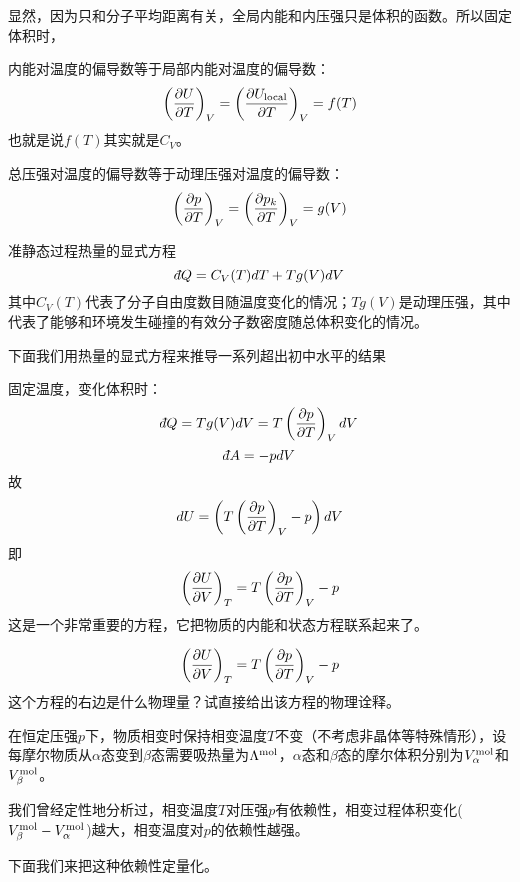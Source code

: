 \documentclass[CJK]{beamer}
\begin{document}
\begin{frame}
\bch
显然，因为只和分子平均距离有关，{\blue 全局内能和内压强只是体积的函数}。所以固定体积时，

\bitem
\item{内能对温度的偏导数等于局部内能对温度的偏导数：
$$ \left(\frac{\partial U}{\partial T}\right)_{V} = \left(\frac{\partial U_{\rm local}}{\partial T}\right)_{V} = f(T) $$
也就是说$f(T)$其实就是$C_V$。}
\item{
总压强对温度的偏导数等于动理压强对温度的偏导数：
$$\left(\frac{\partial p}{\partial T}\right)_{V} = \left(\frac{\partial p_k}{\partial T}\right)_{V} = g(V)$$}
\eitem
\ech
\end{frame}

\begin{frame}
\bch
准静态过程热量的显式方程
\tbox
{$$\dbar Q = C_V(T)dT + T g(V) dV$$}
其中$C_V(T)$代表了分子自由度数目随温度变化的情况；$Tg(V)$是动理压强，其中
代表了能够和环境发生碰撞的有效分子数密度随总体积变化的情况。

\ech
\end{frame}

\begin{frame}
\bch

下面我们用热量的显式方程来推导一系列超出初中水平的结果

\ech
\end{frame}


\begin{frame}
\bch
固定温度，变化体积时：
$$\dbar Q = T g(V)dV = T\pfrac pTV dV$$
$$\dbar A = -pdV$$
故
$$dU = \left(T \left(\frac{\partial p}{\partial T}\right)_{V} - p\right)dV$$
即{\blue
$$\left(\frac{\partial U}{\partial V}\right)_{T} = T \left(\frac{\partial p}{\partial T}\right)_{V} - p$$
}
这是一个非常重要的方程，它把物质的内能和状态方程联系起来了。
\ech
\end{frame}

\begin{frame}
\bch

$$\left(\frac{\partial U}{\partial V}\right)_{T} = T \left(\frac{\partial p}{\partial T}\right)_{V} - p$$
这个方程的右边是什么物理量？试直接给出该方程的物理诠释。

\ech
\end{frame}


\begin{frame}
\bch
{\small

在恒定压强$p$下，物质相变时保持相变温度$T$不变（不考虑非晶体等特殊情形），设每摩尔物质从$\alpha$态变到$\beta$态需要吸热量为$\Lambda^{\rm mol}$，$\alpha$态和$\beta$态的摩尔体积分别为$V_\alpha^{\rm mol}$和$V_\beta^{\rm mol}$。

\skipline

我们曾经定性地分析过，相变温度$T$对压强$p$有依赖性，相变过程体积变化($V_\beta^{\rm mol}-V_\alpha^{\rm mol}$)越大，相变温度对$p$的依赖性越强。

\skipline

下面我们来把这种依赖性定量化。
}
\ech
\end{frame}
\end{document}
